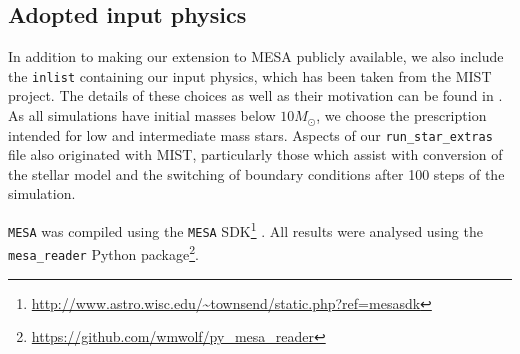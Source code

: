 \subsection{Adopted input physics}
\label{sec: AppB}

In addition to making our extension to MESA publicly available, we also include the \texttt{inlist} containing our input physics, which has been taken from the MIST project. The details of these choices as well as their motivation can be found in \cite{MIST0,MIST1}. As all simulations have initial masses below $10M_{\odot}$, we choose the prescription intended for low and intermediate mass stars. Aspects of our \texttt{run\_star\_extras} file also originated with MIST, particularly those which assist with conversion of the stellar model and the switching of boundary conditions after 100 steps of the simulation.


\texttt{MESA} was compiled using the \texttt{MESA} SDK\footnote{\url{http://www.astro.wisc.edu/~townsend/static.php?ref=mesasdk}} \cite{richard_townsend_2019_2669541}. All results were analysed using the \texttt{mesa\_reader} Python package\footnote{\url{https://github.com/wmwolf/py\_mesa\_reader}}.